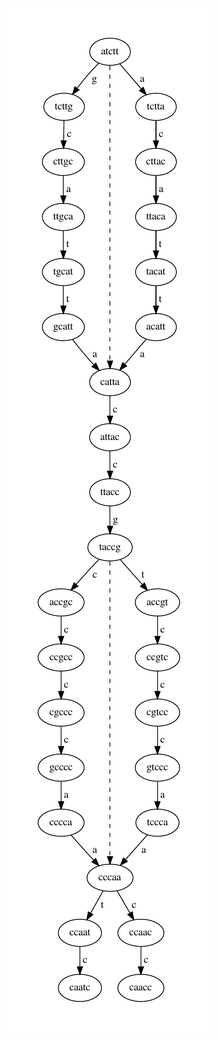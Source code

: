\documentclass[a4paper,12pt, oneside]{book}
\begin{document}
\begin{figure}[H]
  \centering
  \includegraphics[scale = 0.33]{img/mut2.pdf}

\end{figure}
\end{document}
